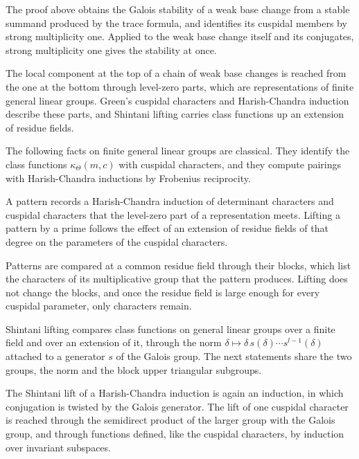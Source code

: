 The proof above obtains the Galois stability of a weak base change from a stable summand produced by
the trace formula, and identifies its cuspidal members by strong multiplicity one. Applied to the
weak base change itself and its conjugates, strong multiplicity one gives the stability at once.

The local component at the top of a chain of weak base changes is reached from the one at the bottom
through level-zero parts, which are representations of finite general linear groups. Green's cuspidal
characters and Harish-Chandra induction describe these parts, and Shintani lifting carries class
functions up an extension of residue fields.

The following facts on finite general linear groups are classical. They identify the class functions
$\kappa_\Theta(m,c)$ with cuspidal characters, and they compute pairings with Harish-Chandra inductions
by Frobenius reciprocity.

A pattern records a Harish-Chandra induction of determinant characters and cuspidal characters that
the level-zero part of a representation meets. Lifting a pattern by a prime follows the effect of an
extension of residue fields of that degree on the parameters of the cuspidal characters.

Patterns are compared at a common residue field through their blocks, which list the characters of its
multiplicative group that the pattern produces. Lifting does not change the blocks, and once the residue
field is large enough for every cuspidal parameter, only characters remain.

Shintani lifting compares class functions on general linear groups over a finite field and over an
extension of it, through the norm $\delta\mapsto\delta\,s(\delta)\cdots s^{l-1}(\delta)$ attached to a
generator $s$ of the Galois group. The next statements share the two groups, the norm and the block upper
triangular subgroups.

The Shintani lift of a Harish-Chandra induction is again an induction, in which conjugation is twisted by
the Galois generator. The lift of one cuspidal character is reached through the semidirect product of the
larger group with the Galois group, and through functions defined, like the cuspidal characters, by
induction over invariant subspaces.

